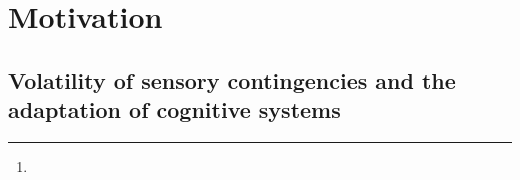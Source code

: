 \documentclass[12pt,english]{article}%
\title{\Title}%
\author{\AuthorA,
\AuthorB,
\AuthorC\thanks{\Address} }
\newcommand{\LP}[1]{\textbf{\textcolor{red}{[LP: #1]}}}
\begin{document}
%
\maketitle%
\begin{abstract}
\Abstract
\end{abstract}
\section{Motivation}
\label{sec:intro}
\subsection{Volatility of sensory contingencies and the adaptation of cognitive systems}
\end{document}
